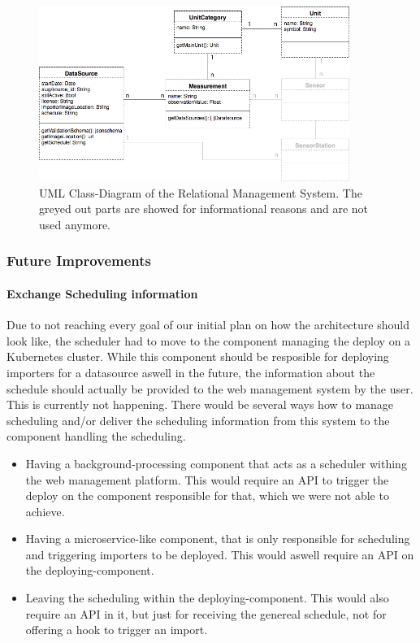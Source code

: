 \begin{figure}
	\begin{center}
		\includegraphics[width=0.9\textwidth]{08_web_mgmt/images/relational_schema.png}
		\caption{UML Class-Diagram of the Relational Management System. The greyed out parts are showed for informational reasons and are not used anymore.}
		\label{image_uml_webmgmt}
	\end{center}
\end{figure}



\subsubsection{Future Improvements}\label{future-improvements}

\paragraph{Exchange Scheduling
	information}\label{exchange-scheduling-information}

Due to not reaching every goal of our initial plan on how the
architecture should look like, the scheduler had to move to the
component managing the deploy on a Kubernetes cluster. While this
component should be resposible for deploying importers for a datasource
aswell in the future, the information about the schedule should actually
be provided to the web management system by the user. This is currently
not happening. There would be several ways how to manage scheduling
and/or deliver the scheduling information from this system to the
component handling the scheduling.

\begin{itemize}
	\item
	Having a background-processing component that acts as a scheduler
	withing the web management platform. This would require an API to
	trigger the deploy on the component responsible for that, which we
	were not able to achieve.
	\item
	Having a microservice-like component, that is only responsible for
	scheduling and triggering importers to be deployed. This would aswell
	require an API on the deploying-component.
	\item
	Leaving the scheduling within the deploying-component. This would also
	require an API in it, but just for receiving the genereal schedule,
	not for offering a hook to trigger an import.
\end{itemize}

